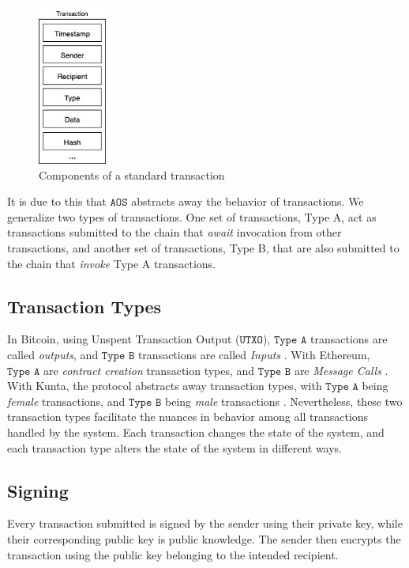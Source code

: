 \documentclass[10pt, titlepage, twocolumn]{report}
\begin{document}
\begin{figure}[ht]
\centering
	\includegraphics[width=0.2\textwidth]{tx}
	\caption{Components of a standard transaction}
	\label{tx}
\end{figure}

\hspace*{15pt}
It is due to this that \(\texttt{AOS}\) abstracts away the behavior of transactions. We generalize two types of transactions. One set of transactions, Type A, act as transactions submitted to the chain that \textit{await} invocation from other transactions, and another set of transactions, Type B, that are also submitted to the chain that \textit{invoke} Type A transactions. 

\subsection{Transaction Types}
\hspace*{15pt}
In Bitcoin, using Unspent Transaction Output (\(\texttt{UTXO}\)), \(\texttt{Type A}\) transactions are called \textit{outputs}, and \(\texttt{Type B}\) transactions are called \textit{Inputs} \cite{BTC}. With Ethereum, \(\texttt{Type A}\) are \textit{contract creation} transaction types, and \(\texttt{Type B}\) are \textit{Message Calls} \cite{ETH}. With Kunta, the protocol abstracts away transaction types, with \(\texttt{Type A}\) being \textit{female} transactions, and \(\texttt{Type B}\) being \textit{male} transactions \cite{KP}. Nevertheless, these two transaction types facilitate the nuances in behavior among all transactions handled by the system. Each transaction changes the state of the system, and each transaction type alters the state of the system in different ways. 


\subsection{Signing}
\hspace*{15pt}
Every transaction submitted is signed by the sender using their private key, while their corresponding public key is public knowledge. The sender then encrypts the transaction using the public key belonging to the intended recipient. 
\end{document}

